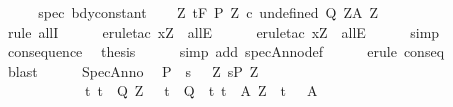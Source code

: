 \begin{isabellebody}
%
\isatagproof
{}\isamarkupfalse%
\ {\isacharminus}\isanewline
\ \ \isamarkupfalse%
\ spec\ bdy{\isacharunderscore}constant\isanewline
\ \ \isamarkupfalse%
\ {\isachardoublequoteopen}{\isasymforall}Z{\isachardot}\ {\isasymGamma}{\isacharcomma}{\isasymTheta}{\isasymturnstile}\isactrlsub t\isactrlbsub {\isacharslash}F\isactrlesub \ {\isacharparenleft}P{\isacharprime}\ Z{\isacharparenright}\ {\isacharparenleft}c\ undefined{\isacharparenright}\ {\isacharparenleft}Q{\isacharprime}\ Z{\isacharparenright}{\isacharcomma}{\isacharparenleft}A{\isacharprime}\ Z{\isacharparenright}{\isachardoublequoteclose}\isanewline
\ \ \ \ \isamarkupfalse%
\ {\isacharminus}\ \isanewline
\ \ \ \ \isamarkupfalse%
\ {\isacharparenleft}rule\ allI{\isacharparenright}\isanewline
\ \ \ \ \isamarkupfalse%
\ {\isacharparenleft}erule{\isacharunderscore}tac\ x{\isacharequal}Z\ \ allE{\isacharparenright}\isanewline
\ \ \ \ \isamarkupfalse%
\ {\isacharparenleft}erule{\isacharunderscore}tac\ x{\isacharequal}Z\ \ allE{\isacharparenright}\isanewline
\ \ \ \ \isamarkupfalse%
\ simp\isanewline
\ \ \ \ \isamarkupfalse%
\isanewline
\ \ \isamarkupfalse%
\ consequence\ \isamarkupfalse%
\ {\isacharquery}thesis\isanewline
\ \ \ \ \isamarkupfalse%
\ {\isacharparenleft}simp\ add{\isacharcolon}\ specAnno{\isacharunderscore}def{\isacharparenright}\isanewline
\ \ \ \ \isamarkupfalse%
\ {\isacharparenleft}erule\ conseq{\isacharparenright}\isanewline
\ \ \ \ \isamarkupfalse%
\ blast\isanewline
\ \ \ \ \isamarkupfalse%
\isanewline
{}\isamarkupfalse%
%
\endisatagproof
{\isafoldproof}%
%
\isadelimproof
\isanewline
%
\endisadelimproof
\isanewline
\isanewline
\isanewline
{}\isamarkupfalse%
\ SpecAnno{\isacharprime}{\isacharcolon}\ \isanewline
\ {\isachardoublequoteopen}{\isasymlbrakk}P\ {\isasymsubseteq}\ {\isacharbraceleft}s{\isachardot}\ \ {\isasymexists}\ Z{\isachardot}\ s{\isasymin}P{\isacharprime}\ Z\ {\isasymand}\ \isanewline
\ \ \ \ \ \ \ \ \ \ \ \ {\isacharparenleft}{\isasymforall}t{\isachardot}\ t\ {\isasymin}\ Q{\isacharprime}\ Z\ {\isasymlongrightarrow}\ \ t\ {\isasymin}\ Q{\isacharparenright}\ {\isasymand}\ {\isacharparenleft}{\isasymforall}t{\isachardot}\ t\ {\isasymin}\ A{\isacharprime}\ Z\ {\isasymlongrightarrow}\ t\ {\isasymin}\ \ A{\isacharparenright}{\isacharbraceright}{\isacharsemicolon}\isanewline

\end{isabellebody}

